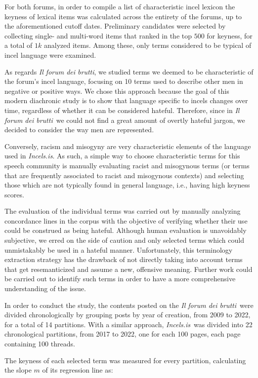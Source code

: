 \documentclass[11pt]{article}
\newcommand{\enforum}{\textit{Incels.is}}
\newcommand{\itforum}{\textit{Il forum dei brutti}}
\begin{document}
For both forums, in order to compile a list of characteristic incel lexicon the keyness of lexical items was calculated across the entirety of the forums, up to the aforementioned cutoff dates. Preliminary candidates were selected by
collecting single- and multi-word items that ranked in the top $500$ for keyness, for a total of $1k$ analyzed items.  Among these, only terms considered to be typical of incel language were examined.

As regards \itforum, we studied terms we deemed to be characteristic of the forum's incel language, focusing on 10 terms used to describe other men in negative or positive ways. We chose this approach because the goal of this modern diachronic study is to show that language specific to incels changes over time, regardless of whether it can be considered hateful. Therefore, since in \itforum\, we could not find a great amount of overtly hateful jargon, we decided to consider the way men are represented.

Conversely, racism and misogyny are very characteristic elements of the language used in \enforum. As such, a simple way to choose characteristic terms for this speech community is manually evaluating racist and misogynous terms (or terms that are frequently associated to racist and misogynous contexts) and selecting those which are not typically found in general language, i.e., having high keyness scores.

The evaluation of the individual terms was carried out by manually analyzing concordance lines in the corpus with the objective of verifying whether their use could be construed as being hateful. Although human evaluation is unavoidably subjective, we erred on the side of caution and only selected terms which could unmistakably be used in a hateful manner. Unfortunately, this terminology extraction strategy has the drawback of not directly taking into account terms that get resemanticized and assume a new, offensive meaning. Further work could be carried out to identify such terms in order to have a more comprehensive understanding of the issue.

In order to conduct the study, the contents posted on the \itforum\, were divided chronologically by grouping posts by year of creation, from 2009 to 2022, for a total of 14 partitions. With a similar approach, \enforum\, was divided into 22 chronological partitions, from 2017 to 2022, one for each 100 pages, each page containing 100 threads.

The keyness of each selected term was measured for every partition, calculating the slope $m$ of its regression line as:
\end{document}
